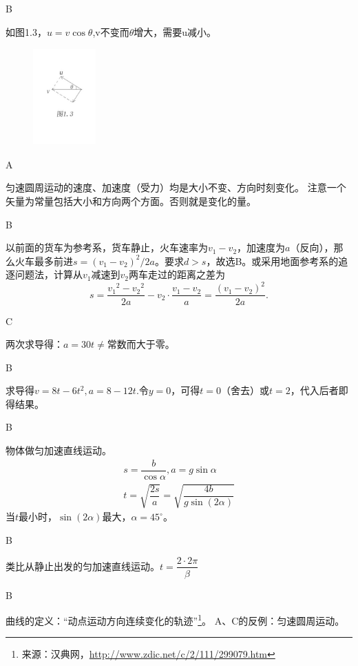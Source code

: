 \documentclass[b5paper,opensource,sourcefont,parskip]{qyxf-book}
\begin{document}
B

\solve 如图1.3，$u=v\cos\theta$,v不变而$\theta$增大，需要u减小。

\begin{figure}[htbp]
	\centering
	\includegraphics[width=6.5em,height=10em]{Chp1_illus3.png}
	\label{fig:Chp1_illus2}
\end{figure}


A

\solve 匀速圆周运动的速度、加速度（受力）均是大小不变、方向时刻变化。
注意一个矢量为常量包括大小和方向两个方面。否则就是变化的量。

B

\solve 以前面的货车为参考系，货车静止，火车速率为$v_1-v_2$，加速度为$a$（反向），那么火车最多前进$s={(v_1-v_2)}^2/{2a}$。要求$d>s$，故选B。或采用地面参考系的追逐问题法，计算从$v_1\text{减速到}v_2$两车走过的距离之差为
\[
s=\dfrac{{v_1}^2-{v_2}^2}{2a}-v_2\cdot \dfrac{v_1-v_2}{a}=\dfrac{{(v_1-v_2)}^2}{2a}.
\]

C

\solve 两次求导得：$a=30t\neq$常数而大于零。

B

\solve 求导得$v=8t-6t^2,a=8-12t$.令$y=0$，可得$t=0$（舍去）或$t=2$，代入后者即得结果。

B

\solve 物体做匀加速直线运动。
\begin{gather*}
s=\dfrac{b}{\cos\alpha},a=g\sin\alpha\\
t=\sqrt{\dfrac{2s}{a}}=\sqrt{\dfrac{4b}{g\sin(2\alpha)}}
\end{gather*}
当$t$最小时，$\sin(2\alpha)$最大，$\alpha=45^\circ$。

B

\solve 类比从静止出发的匀加速直线运动。$t=\dfrac{2\cdot 2\pi}{\beta}$

B

\solve 曲线的定义：“动点运动方向连续变化的轨迹”\footnote{来源：汉典网，\url{http://www.zdic.net/c/2/111/299079.htm}}。
A、C的反例：匀速圆周运动。
\end{document}
